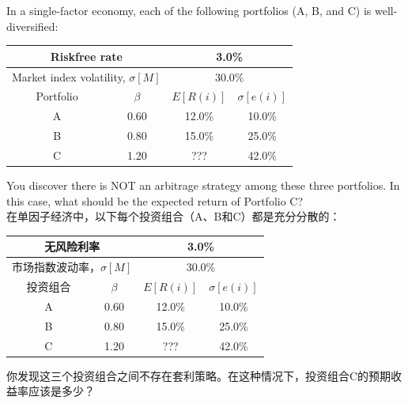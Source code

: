 \documentclass{article}
\newcounter{question} %
\begin{document}
\begin{question}
    In a single-factor economy, each of the following portfolios (A, B, and C) is well-diversified:

    \begin{table}[H]
        \centering
        \begin{tabular}{|c|c|c|c|}
            \hline
            \multicolumn{2}{|c|}{Riskfree rate} & \multicolumn{2}{c|}{3.0\%} \\
            \hline
            \multicolumn{2}{|c|}{Market index volatility, $\sigma[M]$} & \multicolumn{2}{c|}{30.0\%} \\
            \hline
            Portfolio & $\beta$ & $E[R(i)]$ & $\sigma[e(i)]$ \\
            \hline
            A & 0.60 & 12.0\% & 10.0\% \\
            B & 0.80 & 15.0\% & 25.0\% \\
            C & 1.20 & ??? & 42.0\% \\
            \hline
        \end{tabular}
    \end{table}

    You discover there is NOT an arbitrage strategy among these three portfolios. In this case, what should be the expected return of Portfolio C?\\
    在单因子经济中，以下每个投资组合（A、B和C）都是充分分散的：

    \begin{table}[H]
        \centering
        \begin{tabular}{|c|c|c|c|}
            \hline
            \multicolumn{2}{|c|}{无风险利率} & \multicolumn{2}{c|}{3.0\%} \\
            \hline
            \multicolumn{2}{|c|}{市场指数波动率，$\sigma[M]$} & \multicolumn{2}{c|}{30.0\%} \\
            \hline
            投资组合 & $\beta$ & $E[R(i)]$ & $\sigma[e(i)]$ \\
            \hline
            A & 0.60 & 12.0\% & 10.0\% \\
            B & 0.80 & 15.0\% & 25.0\% \\
            C & 1.20 & ??? & 42.0\% \\
            \hline
        \end{tabular}
    \end{table}

    你发现这三个投资组合之间不存在套利策略。在这种情况下，投资组合C的预期收益率应该是多少？\\
\end{question}
\end{document}
